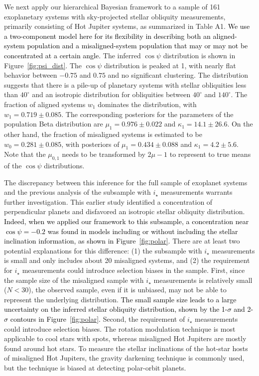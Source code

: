 \documentclass[twocolumn,times]{aastex631}
\newcommand{\edits}[1]{\textcolor{black}{#1}}
\begin{document}
We next apply our hierarchical Bayesian framework to a sample of 161 exoplanetary systems with sky-projected stellar obliquity measurements, primarily consisting of Hot Jupiter systems, as summarized in \cite{Albrecht22} Table A1.
\edits{We use a two-component model here for its flexibility in describing both an aligned-system population and a misaligned-system population that may or may not be concentrated at a certain angle.}
The inferred $\cos{\psi}$ distribution is shown in Figure~\ref{fig:psi_dist}. The $\cos{\psi}$ distribution is peaked at 1, with nearly flat behavior between $-0.75$ and $0.75$ and no significant clustering. The distribution suggests that there is a pile-up of planetary systems with stellar obliquities less than $40^\circ$ and an isotropic distribution for obliquities between $40^\circ$ and $140^\circ$.
The fraction of aligned systems $w_1$ dominates the distribution, with $w_1 = 0.719 \pm 0.085$. The corresponding posteriors for the parameters of the population Beta distribution are $\mu_1 = 0.976 \pm 0.022$ and $\kappa_1 = 14.1 \pm 26.6$. On the other hand, the fraction of misaligned systems is estimated to be $w_0 = 0.281 \pm 0.085$, with posteriors of $\mu_1 = 0.434 \pm 0.088$ and $\kappa_1 = 4.2 \pm 5.6$. Note that the $\mu_{0,1}$ needs to be transformed by $2\mu-1$ to represent to true means of the $\cos{\psi}$ distributions.

The discrepancy between this inference for the full sample of exoplanet systems and the previous analysis of the subsample with $i_\star$ measurements \citep{Albrecht21} warrants further investigation.
This earlier study identified a concentration of perpendicular planets and disfavored an isotropic stellar obliquity distribution. \edits{Indeed, when we applied our framework to this subsample, a concentration near $\cos{\psi} = -0.2$ was found in models including or without including the stellar inclination information, as shown in Figure~\ref{fig:polar}.}
There are at least two potential explanations for this difference: (1) the subsample with $i_\star$ measurements is small and only includes about 20 misaligned systems, and (2) the requirement for $i_\star$ measurements could introduce selection biases in the sample. 
First, since the sample size of the misaligned sample with $i_\star$ measurements is relatively small ($N < 30$), the observed sample, even if it is unbiased, may not be able to represent the underlying distribution. \edits{The small sample size leads to a large uncertainty on the inferred stellar obliquity distribution, shown by the 1-$\sigma$ and 2-$\sigma$ contours in Figure~\ref{fig:polar}.}
Second, the requirement of $i_\star$ measurements could introduce selection biases. The rotation modulation technique is most applicable to cool stars with spots, whereas misaligned Hot Jupiters are mostly found around hot stars. To measure the stellar inclinations of the hot-star hosts of misaligned Hot Jupiters, the gravity darkening technique is commonly used, but the technique is biased at detecting polar-orbit planets.
\end{document}
